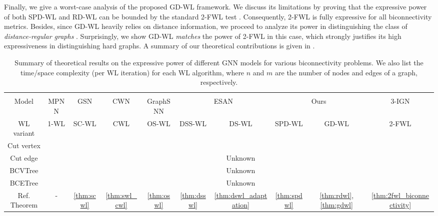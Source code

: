 \documentclass{article} %
\newcommand{\cmark}{\ding{51}}%
\newcommand{\xmark}{\ding{55}}%
\let\cref\crtcref
\begin{document}
Finally, we give a worst-case analysis of the proposed GD-WL framework. We discuss its limitations by proving that the expressive power of both SPD-WL and RD-WL can be bounded by the standard 2-FWL test \citep{cai1992optimal}. Consequently, 2-FWL is fully expressive for all biconnectivity metrics.  Besides, since GD-WL heavily relies on distance information, we proceed to analyze its power in distinguishing the class of \emph{distance-regular graphs} \citep{brouwer1989distance}. Surprisingly, we show GD-WL \emph{matches} the power of 2-FWL in this case, which strongly justifies its high expressiveness in distinguishing hard graphs. A summary of our theoretical contributions is given in \cref{tab:summary_of_results}. 


\begin{table}[t]
    \vspace{-12pt}
    \centering
    \small
    \setlength\tabcolsep{2pt}
    \caption{Summary of theoretical results on the expressive power of different GNN models for various biconnectivity problems. We also list the time/space complexity (per WL iteration) for each WL algorithm, where $n$ and $m$ are the number of nodes and edges of a graph, respectively.}
    \label{tab:summary_of_results}
    \vspace{2pt}
    \begin{tabular}{c|cccc|cc|cc|c}
    \Xhline{0.75pt}
     & \multicolumn{4}{c|}{\cref{sec:counterexamples}} & \multicolumn{2}{c|}{\cref{sec:esan}}  & \multicolumn{3}{c}{\cref{sec:gdwl}}\\
    \cline{2-10}
    Model & MPNN & GSN & CWN & GraphSNN & \multicolumn{2}{c|}{ESAN} & \multicolumn{2}{c|}{Ours} & 3-IGN\\
    WL variant & 1-WL & SC-WL & CWL & OS-WL & DSS-WL & DS-WL & SPD-WL & GD-WL & 2-FWL\\
    \hline
    Cut vertex & \xmark & \xmark & \xmark & \xmark & \cmark & \xmark & \xmark & \cmark & \cmark \\
    Cut edge & \xmark & \xmark & \xmark & \xmark & \cmark & Unknown & \cmark & \cmark & \cmark \\
    BCVTree & \xmark & \xmark & \xmark & \xmark & \cmark & Unknown & \xmark & \cmark & \cmark \\
    BCETree & \xmark & \xmark & \xmark & \xmark & \cmark & Unknown & \cmark & \cmark & \cmark \\
    \hline
    Ref. Theorem & - & \ref{thm:scwl} & \ref{thm:swl_cwl} & \ref{thm:oswl} & \ref{thm:dsswl} & \ref{thm:dswl_adaptation} & \ref{thm:spdwl} & \ref{thm:rdwl}, \ref{thm:gdwl} & \ref{thm:2fwl_biconnectivity}  \\

\end{tabular}
\end{table}
\end{document}
